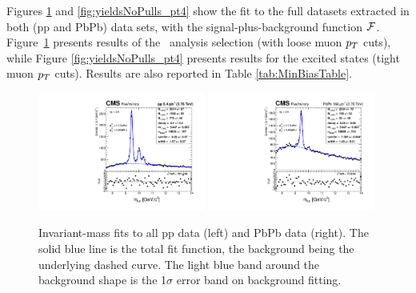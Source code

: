  Figures \ref{fig:yieldsNoPulls_pt3p5} and \ref{fig:yieldsNoPulls_pt4}
 show the fit to the full datasets extracted in both (pp and PbPb)
 data sets, with the
 signal-plus-background function ${\cal F}$. Figure~\ref{fig:yieldsNoPulls_pt3p5} presents results of the \PgUa\ analysis
selection (with loose muon $p_{T}$ cuts), while
Figure \ref{fig:yieldsNoPulls_pt4} presents results for the excited
states (tight muon $p_{T}$ cuts). Results are also reported in Table \ref{tab:MinBiasTable}.
%
\begin{figure}[h]
\centering
\includegraphics[width=0.49\textwidth]{Chapters/aYield/pp/pt_3p5_4/Rap/Rap_0_2p4/pp2p76tev_Rap_0_2p4_fsr1_3Spositive.pdf}
\includegraphics[width=0.49\textwidth]{Chapters/aYield/PbPb/pt_3p5_4/Rap/Rap_0_2p4/PbPb_Rap_0_2p4_fsr1.pdf}
\caption{\label{fig:yieldsNoPulls_pt3p5} Invariant-mass fits to all pp data (left) and PbPb data
  (right). The solid blue line is the total fit
  function, the background being the underlying dashed curve. The
  light blue band around the background shape is the 1$\sigma$ error
  band on background fitting.}
\end{figure}

